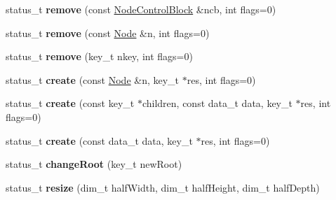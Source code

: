 \begin{DoxyCompactItemize}
\mbox{\label{class_hash_octree_1_1_hash_octree_a7943b3b188e74d60a1fda9481790de9f}} 
status\+\_\+t {\bfseries remove} (const \mbox{\hyperlink{class_hash_octree_1_1_node_control_block}{Node\+Control\+Block}} \&ncb, int flags=0)
\item 
\mbox{\label{class_hash_octree_1_1_hash_octree_a124574ae9ee2a67f570e21fd5fb514e6}} 
status\+\_\+t {\bfseries remove} (const \mbox{\hyperlink{class_hash_octree_1_1_node}{Node}} \&n, int flags=0)
\item 
\mbox{\label{class_hash_octree_1_1_hash_octree_a7dd230a896779e16fb86a2f85c84e67a}} 
status\+\_\+t {\bfseries remove} (key\+\_\+t nkey, int flags=0)
\item 
\mbox{\label{class_hash_octree_1_1_hash_octree_ae31f35cf0eeab0d7ec255e8ebb7e57cf}} 
status\+\_\+t {\bfseries create} (const \mbox{\hyperlink{class_hash_octree_1_1_node}{Node}} \&n, key\+\_\+t $\ast$res, int flags=0)
\item 
\mbox{\label{class_hash_octree_1_1_hash_octree_a17e3fcea0618a43e681a6134b5249bba}} 
status\+\_\+t {\bfseries create} (const key\+\_\+t $\ast$children, const data\+\_\+t data, key\+\_\+t $\ast$res, int flags=0)
\item 
\mbox{\label{class_hash_octree_1_1_hash_octree_a42856bbee42ad14579ea671be78eb684}} 
status\+\_\+t {\bfseries create} (const data\+\_\+t data, key\+\_\+t $\ast$res, int flags=0)
\item 
\mbox{\label{class_hash_octree_1_1_hash_octree_aa79e8b65dfb51c666074b12c693cea5c}} 
status\+\_\+t {\bfseries change\+Root} (key\+\_\+t new\+Root)
\item 
\mbox{\label{class_hash_octree_1_1_hash_octree_ad4821f26085b729920cdf5f6dcc4566f}} 
status\+\_\+t {\bfseries resize} (dim\+\_\+t half\+Width, dim\+\_\+t half\+Height, dim\+\_\+t half\+Depth)
\item 
\mbox{\label{class_hash_octree_1_1_hash_octree_a898985692691738c8ebac68adfed4326}} 

\end{DoxyCompactItemize}
